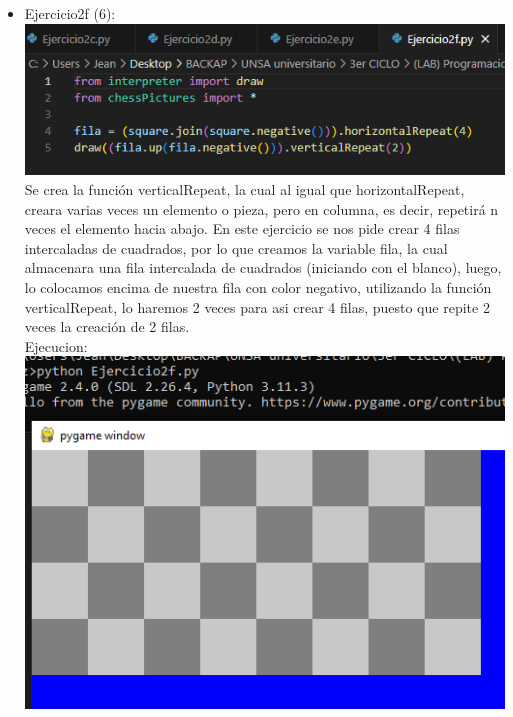 \documentclass[]{article}
\begin{document}
\begin{itemize}
            \item Ejercicio2f (6): \\
            \includegraphics[]{../img/img14.png}\\
            Se crea la función verticalRepeat, la cual al igual que horizontalRepeat, creara varias veces un
            elemento o pieza, pero en columna, es decir, repetirá n veces el elemento hacia abajo.
            En este ejercicio se nos pide crear 4 filas intercaladas de cuadrados, por lo que creamos la variable fila, la cual almacenara una fila intercalada de cuadrados (iniciando con el blanco), luego, lo
            colocamos encima de nuestra fila con color negativo, utilizando la función verticalRepeat, lo
            haremos 2 veces para asi crear 4 filas, puesto que repite 2 veces la creación de 2 filas. \\
            Ejecucion:\\
            \includegraphics[]{../img/img15.png}\\


\end{itemize}
\end{document}
